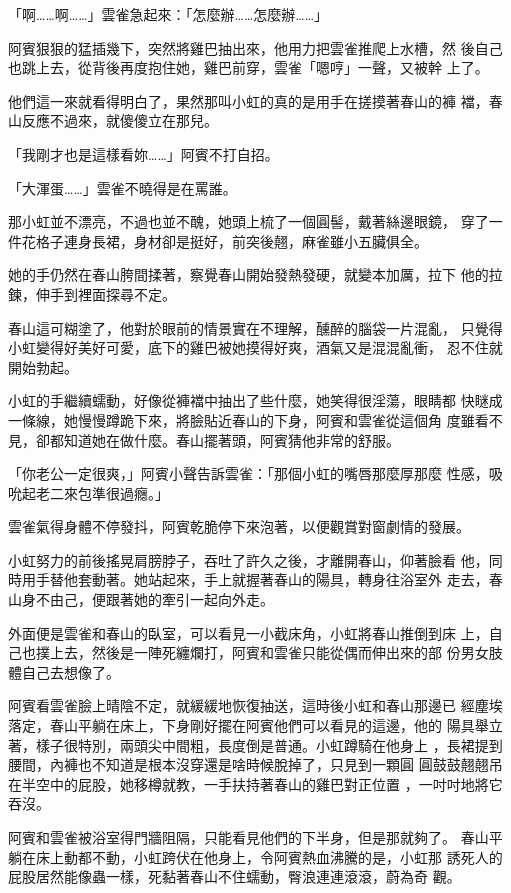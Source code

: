 「啊……啊……」雲雀急起來：「怎麼辦……怎麼辦……」

阿賓狠狠的猛插幾下，突然將雞巴抽出來，他用力把雲雀推爬上水槽，然
後自己也跳上去，從背後再度抱住她，雞巴前穿，雲雀「嗯哼」一聲，又被幹
上了。

他們這一來就看得明白了，果然那叫小虹的真的是用手在搓摸著春山的褲
襠，春山反應不過來，就傻傻立在那兒。

「我剛才也是這樣看妳……」阿賓不打自招。

「大渾蛋……」雲雀不曉得是在罵誰。

那小虹並不漂亮，不過也並不醜，她頭上梳了一個圓髻，戴著絲邊眼鏡，
穿了一件花格子連身長裙，身材卻是挺好，前突後翹，麻雀雖小五臟俱全。

她的手仍然在春山胯間揉著，察覺春山開始發熱發硬，就變本加厲，拉下
他的拉鍊，伸手到裡面探尋不定。

春山這可糊塗了，他對於眼前的情景實在不理解，醺醉的腦袋一片混亂，
只覺得小虹變得好美好可愛，底下的雞巴被她摸得好爽，酒氣又是混混亂衝，
忍不住就開始勃起。

小虹的手繼續蠕動，好像從褲襠中抽出了些什麼，她笑得很淫蕩，眼睛都
快瞇成一條線，她慢慢蹲跪下來，將臉貼近春山的下身，阿賓和雲雀從這個角
度雖看不見，卻都知道她在做什麼。春山擺著頭，阿賓猜他非常的舒服。

「你老公一定很爽，」阿賓小聲告訴雲雀：「那個小虹的嘴唇那麼厚那麼
性感，吸吮起老二來包準很過癮。」

雲雀氣得身體不停發抖，阿賓乾脆停下來泡著，以便觀賞對窗劇情的發展。

小虹努力的前後搖晃肩膀脖子，吞吐了許久之後，才離開春山，仰著臉看
他，同時用手替他套動著。她站起來，手上就握著春山的陽具，轉身往浴室外
走去，春山身不由己，便跟著她的牽引一起向外走。

外面便是雲雀和春山的臥室，可以看見一小截床角，小虹將春山推倒到床
上，自己也撲上去，然後是一陣死纏爛打，阿賓和雲雀只能從偶而伸出來的部
份男女肢體自己去想像了。

阿賓看雲雀臉上晴陰不定，就緩緩地恢復抽送，這時後小虹和春山那邊已
經塵埃落定，春山平躺在床上，下身剛好擺在阿賓他們可以看見的這邊，他的
陽具舉立著，樣子很特別，兩頭尖中間粗，長度倒是普通。小虹蹲騎在他身上
，長裙提到腰間，內褲也不知道是根本沒穿還是啥時候脫掉了，只見到一顆圓
圓鼓鼓翹翹吊在半空中的屁股，她移樽就教，一手扶持著春山的雞巴對正位置
，一吋吋地將它吞沒。

阿賓和雲雀被浴室得門牆阻隔，只能看見他們的下半身，但是那就夠了。
春山平躺在床上動都不動，小虹跨伏在他身上，令阿賓熱血沸騰的是，小虹那
誘死人的屁股居然能像蟲一樣，死黏著春山不住蠕動，臀浪連連滾滾，蔚為奇
觀。

